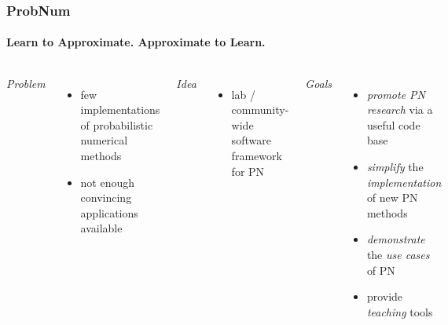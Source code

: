 \documentclass[10pt,usepdftitle=false,aspectratio=169]{beamer}
\begin{document}
\begin{frame}\frametitle{ProbNum}
	\framesubtitle{Learn to Approximate. Approximate to Learn.}

	\begin{columns}[totalwidth=\textwidth]

		\emph{Problem}
		\begin{itemize}
			\item few implementations of probabilistic numerical methods
			\item not enough convincing applications available
		\end{itemize}

		\emph{Idea}
		\begin{itemize}
			\item lab / community-wide software framework for PN
		\end{itemize}

		\emph{Goals}
		\begin{itemize}
			\item \textit{promote PN research} via a useful code base
			\item \textit{simplify} the \textit{implementation} of new PN methods
			\item \textit{demonstrate} the \textit{use cases} of PN
			\item provide \textit{teaching} tools
		\end{itemize}


\end{columns}
\end{frame}
\end{document}
